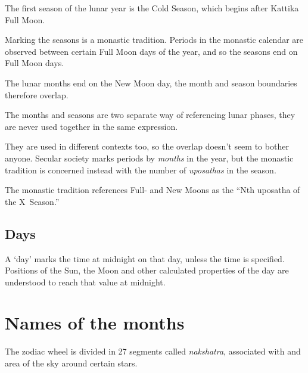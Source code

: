 \documentclass[11pt,oneside]{memoir-article}
\begin{document}

The first season of the lunar year is the Cold Season, which begins after
Kattika Full Moon.

Marking the seasons is a monastic tradition. Periods in the monastic calendar
are observed between certain Full Moon days of the year, and so the seasons end
on Full Moon days.

The lunar months end on the New Moon day, the month and season boundaries
therefore overlap.

The months and seasons are two separate way of referencing lunar phases, they
are never used together in the same expression.

They are used in different contexts too, so the overlap doesn't seem to bother
anyone. Secular society marks periods by \emph{months} in the year, but the monastic
tradition is concerned instead with the number of \emph{uposathas} in the season.

The monastic tradition references Full- and New Moons as the ``Nth uposatha of the X~Season.''

\subsection{Days}
\label{sec-3-2-4}

A `day' marks the time at midnight on that day, unless the time is specified.
Positions of the Sun, the Moon and other calculated properties of the day are
understood to reach that value at midnight.

\section{Names of the months}
\label{sec-3-3}

The zodiac wheel is divided in 27 segments called \emph{nakshatra}, associated with
and area of the sky around certain stars.
\end{document}
